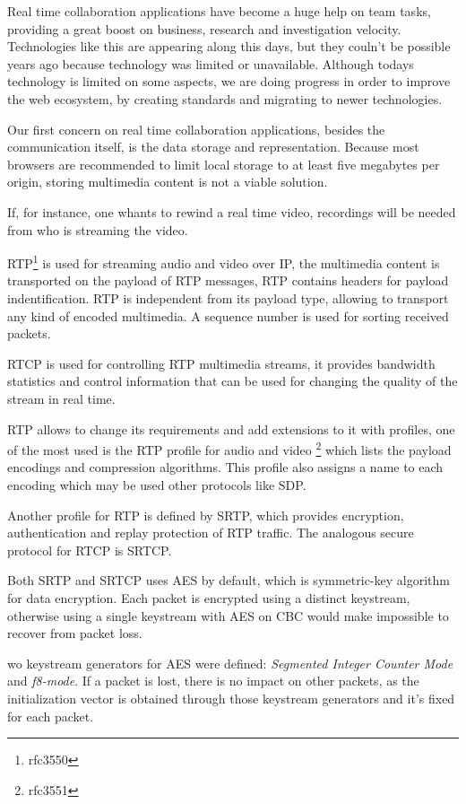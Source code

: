 
 	Real time collaboration applications have become a huge help on team tasks, providing a great boost on business, research and investigation velocity. Technologies like this are appearing along this days, but they couln't be possible years ago because technology was limited or unavailable. Although todays technology is limited on some aspects, we are doing progress in order to improve the web ecosystem, by creating standards and migrating to newer technologies.

 	Our first concern on real time collaboration applications, besides the communication itself, is the data storage and representation. Because most browsers are recommended to limit local storage to at least five megabytes per origin, storing multimedia content is not a viable solution.

	If, for instance, one whants to rewind a real time video, recordings will be needed from who is streaming the video. 

  \ac{RTP}\footnote{rfc3550} is used for streaming audio and video over \ac{IP}, the multimedia content is transported on the payload of \ac{RTP} messages, \ac{RTP} contains headers for payload indentification. \ac{RTP} is independent from its payload type, allowing to transport any kind of encoded multimedia. A sequence number is used for sorting received packets.

\ac{RTCP} is used for controlling \ac{RTP} multimedia streams, it provides bandwidth statistics and control information that can be used for changing the quality of the stream in real time.

  \ac{RTP} allows to change its requirements and add extensions to it with profiles, one of the most used is the \ac{RTP} profile for audio and video \footnote{rfc3551} which lists the payload encodings and compression algorithms. This profile also assigns a name to each encoding which may be used other protocols like \ac{SDP}.

  Another profile for \ac{RTP} is defined by \ac{SRTP}, which provides encryption, authentication and replay protection of \ac {RTP} traffic. The analogous secure protocol for \ac{RTCP} is \ac{SRTCP}.

  Both \ac{SRTP} and \ac{SRTCP} uses \ac{AES} by default, which is symmetric-key algorithm for data encryption. Each packet is encrypted using a distinct keystream, otherwise using a single keystream with \ac{AES} on \ac{CBC} would make impossible to recover from packet loss.

  wo keystream generators for \ac{AES} were defined: \textit{Segmented Integer Counter Mode} and \textit{f8-mode}. If a packet is lost, there is no impact on other packets, as the initialization vector is obtained through those keystream generators and it's fixed for each packet.

